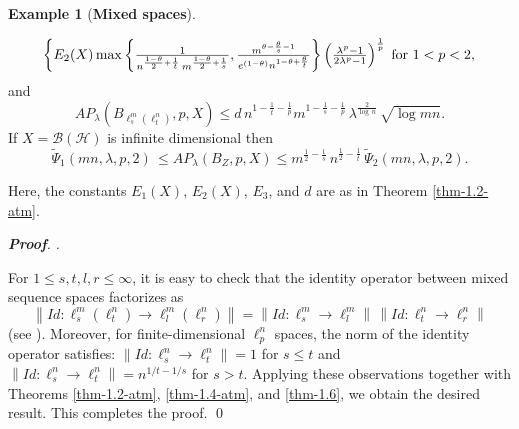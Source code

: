 \documentclass[a4paper,11pt, reqno]{amsart}
\theoremstyle{definition}
\newtheorem{example}{Example}[section]
\newenvironment{pf}[1][]{%
	\vskip 3mm
	\noindent
	\ifthenelse{\equal{#1}{}}%
	{{\slshape {\bf Proof}. }}%
	{{\slshape #1.} }%
}%
{\qed\bigskip}
\newcommand{\norm}[1]{\left\lVert#1\right\rVert}
\begin{document}
\begin{example}[{\bf Mixed spaces}]
\begin{enumerate}
\begin{equation*}
\begin{cases}
					E_{2}(X)  \max \left\{\frac{1}{n^{\frac{1-\theta}{2}+\frac{1}{t}}\,m^{\frac{1-\theta}{2}+\frac{1}{s}}}, \frac{m^{\theta -\frac{\theta}{s}-1}}{e^{(1-\theta)} n^{1-\theta +\frac{\theta}{t}}}\right\}\left(\frac{\lambda^p -1}{2\lambda^p - 1}\right)^{\frac{1}{p}}  \hspace{-2mm} & \text{for $1<p< 2$}, 
				\end{cases}
			\end{equation*}
			and
			$$AP_{\lambda}(B_{\ell^m_s(\ell^n_t)}, p,X) \leq d\,n^{1-\frac{1}{t}-\frac{1}{p}}m^{1-\frac{1}{s}-\frac{1}{p}}\, \lambda^{\frac{2}{\log \, n}}\, \sqrt{\log mn}.
			$$
			If $X=\mathcal{B}(\mathcal{H})$ is infinite dimensional then
			$$\tilde{\Psi}_{1}(mn,\lambda,p,2)\, \leq AP_{\lambda}(B_{Z}, p,X) \leq m^{\frac{1}{2}-\frac{1}{s}}\,n^{\frac{1}{2}-\frac{1}{t}} \, \tilde{\Psi}_{2}(mn,\lambda,p,2).
			$$
		\end{enumerate}
		Here, the constants $E_{1}(X)$, $E_{2}(X)$, $E_{3}$, and $d$ are as in Theorem \ref{thm-1.2-atm}.	
	\end{example}
	\begin{pf}
	For $1\leq s,t,l,r \leq \infty$, it is easy to check that the identity operator between mixed sequence spaces factorizes as 
		$$\norm{Id:\ell^m_s(\ell^n_t) \rightarrow \ell^m_l(\ell^n_r)}= \norm{Id:\ell^m_s \rightarrow \ell^m_l}\, \norm{Id:\ell^n_t \rightarrow \ell^n_r}$$
		 (see \cite[p. 188]{defant-2003}). Moreover, for finite-dimensional $\ell^n_p$ spaces, the norm of the identity operator satisfies: $\norm{Id:\ell^n_s \rightarrow \ell^n_t}=1$ for $s \leq t$ and $\norm{Id:\ell^n_s \rightarrow \ell^n_t}=n^{1/t - 1/s}$ for $s>t$. Applying these observations together with Theorems \ref{thm-1.2-atm}, \ref{thm-1.4-atm}, and \ref{thm-1.6}, we obtain the desired result. This completes the proof.
	\end{pf}
\end{document}
